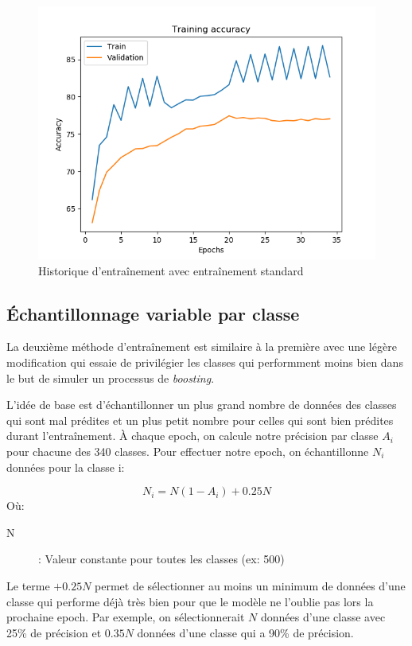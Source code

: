 \begin{figure}[h]
	\includegraphics[width=\linewidth]{images/Model_general.png} %
	\caption{Historique d'entraînement avec entraînement standard} %
	\label{histmodelnormal} 
\end{figure}


\subsection{Échantillonnage variable par classe}
La deuxième méthode d'entraînement est similaire à la première avec une légère modification qui essaie de privilégier les classes qui performment moins bien dans le but de simuler un processus de \emph{boosting}.


L'idée de base est d'échantillonner un plus grand nombre de données des classes qui sont mal prédites et un plus petit nombre pour celles qui sont bien prédites durant l'entraînement. 
À chaque epoch, on calcule notre précision par classe $A_i$ pour chacune des 340 classes. 
Pour effectuer notre epoch, on échantillonne $N_i$ données pour la classe i:

$$N_i=N(1-A_i)+0.25N$$
Où:
\begin{description}
\item[N]: Valeur constante pour toutes les classes (ex: 500)
\end{description}

Le terme $+0.25N$ permet de sélectionner au moins un minimum de données d'une classe qui performe déjà très bien pour que le modèle ne l'oublie pas lors la prochaine epoch.  Par exemple, on sélectionnerait $N$ données d'une classe avec 25\% de précision et $0.35N$ données d'une classe qui a 90\% de précision.


